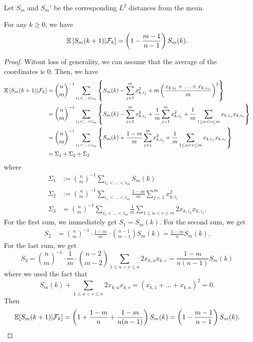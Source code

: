 \documentclass[12pt]{article}
\begin{document}
Let $S_m$ and $S_m'$ be the corresponding $L^2$ distances from the mean.

\begin{prop} \label{explicit-formula-1}
	For any $k \geq 0$, we have 
	\[
		\mathbb{E} \left [ S_m(k+1) | \mathcal{F}_k \right ] = \left ( 1 - \frac{m-1}{n-1} \right ) S_m(k).	
	\]
\end{prop}

\begin{proof}
	Witout loss of generality, we can assume that the average of the coordinates is $0$. Then, we have 
	\begin{align*}
		\mathbb{E} \left [ S_m(k+1) | \mathcal{F}_k \right ] & = \binom{n}{m}^{-1} \sum_{i_1 < \ldots < i_m} \left \{ S_m(k) - \sum_{j = 1}^m x_{k, i_j}^2 + m \left ( \frac{x_{k, i_1} + \ldots + x_{k, i_m}}{m} \right )^2 \right \} \\
		& = \binom{n}{m}^{-1} \sum_{i_1 < \ldots < i_m} \left \{ S_m(k) - \sum_{j = 1}^m x_{k, i_j}^2  + \frac{1}{m} \sum_{j = 1}^m x_{k, i_j}^2 + \frac{1}{m} \sum_{1 \leq u < v \leq m} x_{k, i_u} x_{k, i_v} \right \} \\
		& = \binom{n}{m}^{-1} \sum_{i_1 < \ldots < i_m} \left \{ S_m(k) + \frac{1-m}{m} \sum_{j = 1}^m x_{k, i_j}^2 + \frac{1}{m} \sum_{1 \leq u < v \leq m} x_{k, i_u} x_{k, i_v} \right \} \\
		& = \Sigma_1 + \Sigma_2 + \Sigma_3
	\end{align*}
	where 
	\begin{align*}
		\Sigma_1 & := \binom{n}{m}^{-1} \sum_{i_1 < \ldots < i_m} S_m(k) \\
		\Sigma_2 & := \binom{n}{m}^{-1} \sum_{i_1 < \ldots < i_m} \frac{1-m}{m} \sum_{j = 1}^m x_{k, i_j}^2 \\
		\Sigma_3 & = \binom{n}{m}^{-1} \sum_{i_1 < \ldots < i_m} \frac{1}{m} \sum_{1 \leq u < v \leq m} 2x_{k, i_u} x_{k, i_v}.
	\end{align*}
	For the first sum, we immediately get $S_1 = S_m(k)$. For the second sum, we get 
	\begin{align*}
		S_2 & = \binom{n}{m}^{-1} \cdot \frac{1-m}{m} \cdot \binom{n-1}{m-1} S_m(k) = \frac{1-m}{n} S_m(k). 
	\end{align*}
	For the last sum, we get 
	\[
		S_3 = \binom{n}{m}^{-1} \cdot \frac{1}{m} \cdot \binom{n-2}{m-2} \sum_{1 \leq u < v \leq n} 2x_{k, u} x_{k, v} = \frac{1-m}{n(n-1)} S_m(k)
	\]
	where we used the fact that 
	\[
		S_m(k) + \sum_{1 \leq u < v \leq n} 2x_{k, u} x_{k, v} = (x_{k, 1} + \ldots + x_{k, n})^2 = 0.	
	\]
	Then 
	\[
		\mathbb{E} [S_m(k+1) | \mathcal{F}_k] = \left ( 1 + \frac{1-m}{n} + \frac{1-m}{n(n-1)} \right ) S_m(k) = \left ( 1 - \frac{m-1}{n-1} \right ) S_m(k).	
	\]
\end{proof}
\end{document}
